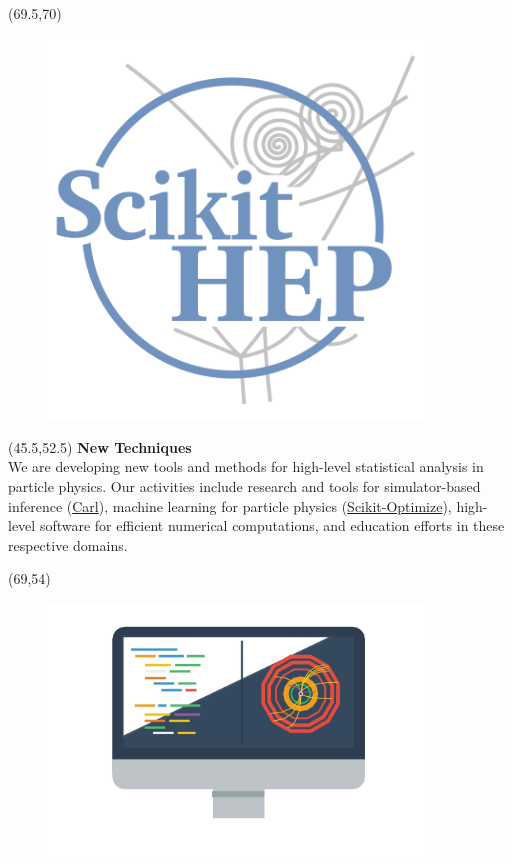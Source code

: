 \documentclass[final]{beamer}
\begin{document}
\begin{frame}{}
\begin{textblock}{12.0}(69.5,70)
\begin{figure}[tbph]
\centering
\includegraphics[width=0.9\textwidth]{images/scikit-hep-logo_800.png}
\end{figure}
\end{textblock}

\begin{textblock}{22.5}(45.5,52.5)
\textcolor{mybluelabel}{\bf New Techniques} \\
We are developing new tools and methods for
high-level statistical analysis in particle physics. Our activities
include research and tools for simulator-based inference (\href{http://diana-hep.org/carl/}{Carl}), machine
learning for particle physics (\href{https://scikit-optimize.github.io/}{Scikit-Optimize}), high-level software for efficient numerical
computations, and education efforts in these respective domains.
\end{textblock}

\begin{textblock}{12.5}(69,54)
\begin{figure}[tbph]
\centering
\includegraphics[width=0.9\textwidth]{images/better-software.jpg}
\end{figure}
\end{textblock}


\end{frame}
\end{document}
